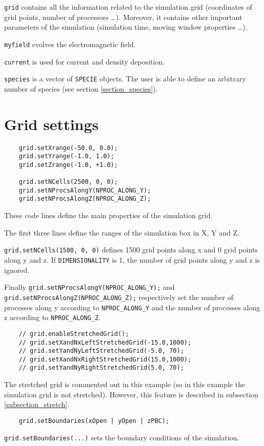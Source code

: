 \documentclass[11pt,a4paper]{report}
\begin{document}
\verb+grid+ contains all the information related to the simulation grid (coordinates of grid points, number of processors \ldots). Moreover, it contains other important parameters of the simulation (simulation time, moving window properties \ldots).

\verb+myfield+ evolves the electromagnetic field.

\verb+current+ is used for current and density deposition.

\verb+species+ is a vector of \verb+SPECIE+ objects. The user is able to define an arbitrary number of species (see section \ref{section_species}).


\section{Grid settings}
\begin{lstlisting}
	grid.setXrange(-50.0, 0.0);
	grid.setYrange(-1.0, 1.0);
	grid.setZrange(-1.0, +1.0);

	grid.setNCells(2500, 0, 0);
	grid.setNProcsAlongY(NPROC_ALONG_Y);
	grid.setNProcsAlongZ(NPROC_ALONG_Z);
\end{lstlisting}
These code lines define the main properties of the simulation grid.

The first three lines define the ranges of the simulation box in X, Y and Z.

\verb+grid.setNCells(1500, 0, 0)+ defines 1500 grid points along x and 0 grid points along y and z. If \verb+DIMENSIONALITY+ is 1, the number of grid points along y and z is ignored.

Finally \verb+grid.setNProcsAlongY(NPROC_ALONG_Y);+ and \verb+grid.setNProcsAlongZ(NPROC_ALONG_Z);+ respectively set the number of processes along y according to \verb+NPROC_ALONG_Y+ and the number of processes along z according to \verb+NPROC_ALONG_Z+.
\begin{lstlisting}
	// grid.enableStretchedGrid();
	// grid.setXandNxLeftStretchedGrid(-15.0,1000);
	// grid.setYandNyLeftStretchedGrid(-5.0, 70);
	// grid.setXandNxRightStretchedGrid(15.0,1000);
	// grid.setYandNyRightStretchedGrid(5.0, 70);
\end{lstlisting}
The stretched grid is commented out in this example (so in this example the simulation grid is not stretched). However, this feature is described in subsection \ref{subsection_stretch}.
\begin{lstlisting}
	grid.setBoundaries(xOpen | yOpen | zPBC);
\end{lstlisting}
\verb+grid.setBoundaries(...)+ sets the boundary conditions of the simulation.
\end{document}
